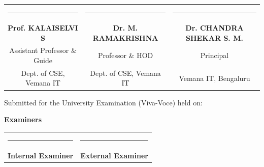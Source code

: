 \vspace{0.3in}
\begin{center}
\begin{tabular}{ccc}
\rule{4.2cm}{0.4pt} & \rule{4.2cm}{0.4pt} & \rule{4.6cm}{0.4pt} \\
\textbf{Prof. KALAISELVI S} & \textbf{Dr. M. RAMAKRISHNA} & \textbf{Dr. CHANDRA SHEKAR S. M.} \\
Assistant Professor \& Guide & Professor \& HOD & Principal \\
Dept. of CSE, Vemana IT & Dept. of CSE, Vemana IT & Vemana IT, Bengaluru \\
\end{tabular}
\end{center}

\vspace{0.25in}
\noindent Submitted for the University Examination (Viva-Voce) held on: \underline{\hspace{3.5cm}}

\vspace{0.2in}
\begin{center}
\textbf{Examiners}
\vspace{0.15in}

\begin{tabular}{cc}
\rule{4.5cm}{0.4pt} & \hspace{4cm} \rule{4.5cm}{0.4pt} \\
\textbf{Internal Examiner} & \hspace{4cm} \textbf{External Examiner}
\end{tabular}
\end{center}
\newpage
